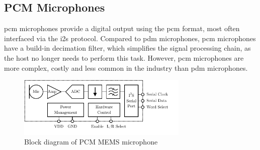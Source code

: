 \subsection{PCM Microphones}
\acrshort{pcm} microphones provide a digital output using the \acrlong{pcm} format, most often interfaced via the \acrshort{i2s} protocol.
Compared to \acrshort{pdm} microphones, \acrshort{pcm} microphones have a build-in decimation filter, which simplifies the signal processing chain, as the host no longer needs to perform this task.
However, \acrshort{pcm} microphones are more complex, costly and less common in the industry than \acrshort{pdm} microphones.
\begin{figure}[h!]
	\centering
	\vspace{-0.1cm}
	\includegraphics[height=2.9cm, trim={0 0.4cm 0 0}]{images/2_preliminaries/mems_microphone_types_pcm.pdf}
	\caption{Block diagram of PCM MEMS microphone}
	\label{fig:mems_microphone_types_pcm}
\end{figure}
\clearpage

